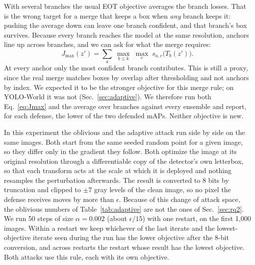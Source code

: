 \documentclass[11pt]{article}
\newcommand{\yw}{YOLO-World}
\begin{document}
With several branches the usual EOT objective averages the branch losses.
That is the wrong target for a merge that keeps a box when \emph{any} branch
keeps it: pushing the average down can leave one branch confident, and that
branch's box survives. Because every branch reaches the model at the same
resolution, anchors line up across branches, and we can ask for what the
merge requires:
\begin{equation}
J_{\max}(z') = \sum_{a}\; \max_{b\le k}\; \max_{c}\; s_{a,c}\big(T_b(z')\big).
\label{eq:Jmax}
\end{equation}
At every anchor only the most confident branch contributes. This is still a
proxy, since the real merge matches boxes by overlap after thresholding and
not anchors by index. We expected it to be the stronger objective for this
merge rule; on \yw{} it was not (Sec.~\ref{sec:adaptive}). We therefore run
both Eq.~\ref{eq:Jmax} and the average over branches against every ensemble
and report, for each defense, the lower of the two defended mAPs. Neither
objective is new.

In this experiment the oblivious and the adaptive attack run side by side on
the same images. Both start from the same seeded random point for a given
image, so they differ only in the gradient they follow. Both optimize the
image at its original resolution through a differentiable copy of the
detector's own letterbox, so that each transform acts at the scale at which
it is deployed and nothing resamples the perturbation afterwards. The result
is converted to 8 bits by truncation and clipped to $\pm7$ gray levels of the
clean image, so no pixel the defense receives moves by more than $\epsilon$.
Because of this change of attack space, the oblivious numbers of
Table~\ref{tab:adaptive} are not the ones of Sec.~\ref{sec:rq2}. We run
50 steps of size $\alpha=0.002$ (about $\epsilon/15$) with one restart, on
the first 1{,}000 images. Within
a restart we keep whichever of the last iterate and the lowest-objective
iterate seen during the run has the lower objective after the 8-bit
conversion, and across restarts the restart whose result has the lowest
objective. Both attacks use this rule, each with its own objective.
\end{document}
